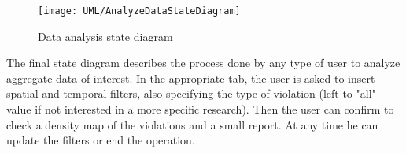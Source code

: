 \begin{figure}[H]
	\centering
	\texttt{[image: UML/AnalyzeDataStateDiagram]}
	\caption{Data analysis state diagram}
\end{figure}

The final state diagram describes the process done by any type of user to analyze aggregate data of interest. In the appropriate tab, the user is asked to insert spatial and temporal filters, also specifying the type of violation (left to "all" value if not interested in a more specific research). Then the user can confirm to check a density map of the violations and a small report. At any time he can update the filters or end the operation.